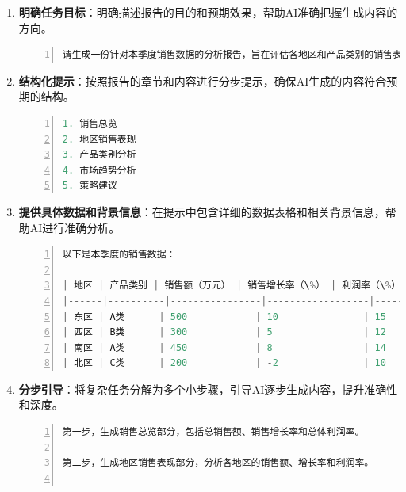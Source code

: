\begin{enumerate}
    \item \textbf{明确任务目标}：明确描述报告的目的和预期效果，帮助AI准确把握生成内容的方向。
    
    \begin{lstlisting}[language={python},label={},caption={}, basicstyle=\footnotesize\ttfamily, breaklines=true, numbers=left, frame=single]
请生成一份针对本季度销售数据的分析报告，旨在评估各地区和产品类别的销售表现，并提出改进策略。
\end{lstlisting}
    
    \item \textbf{结构化提示}：按照报告的章节和内容进行分步提示，确保AI生成的内容符合预期的结构。
    
    \begin{lstlisting}[language={python},label={},caption={}, basicstyle=\footnotesize\ttfamily, breaklines=true, numbers=left, frame=single]
1. 销售总览
2. 地区销售表现
3. 产品类别分析
4. 市场趋势分析
5. 策略建议
\end{lstlisting}
    
    \item \textbf{提供具体数据和背景信息}：在提示中包含详细的数据表格和相关背景信息，帮助AI进行准确分析。
    
    \begin{lstlisting}[language={python},label={},caption={}, basicstyle=\footnotesize\ttfamily, breaklines=true, numbers=left, frame=single]
以下是本季度的销售数据：

| 地区 | 产品类别 | 销售额（万元） | 销售增长率（\%） | 利润率（\%） |
|------|----------|----------------|------------------|--------------|
| 东区 | A类      | 500            | 10               | 15           |
| 西区 | B类      | 300            | 5                | 12           |
| 南区 | A类      | 450            | 8                | 14           |
| 北区 | C类      | 200            | -2               | 10           |
\end{lstlisting}
    
    \item \textbf{分步引导}：将复杂任务分解为多个小步骤，引导AI逐步生成内容，提升准确性和深度。
    
    \begin{lstlisting}[language={python},label={},caption={}, basicstyle=\footnotesize\ttfamily, breaklines=true, numbers=left, frame=single]
第一步，生成销售总览部分，包括总销售额、销售增长率和总体利润率。

第二步，生成地区销售表现部分，分析各地区的销售额、增长率和利润率。


\end{lstlisting}
\end{enumerate}
